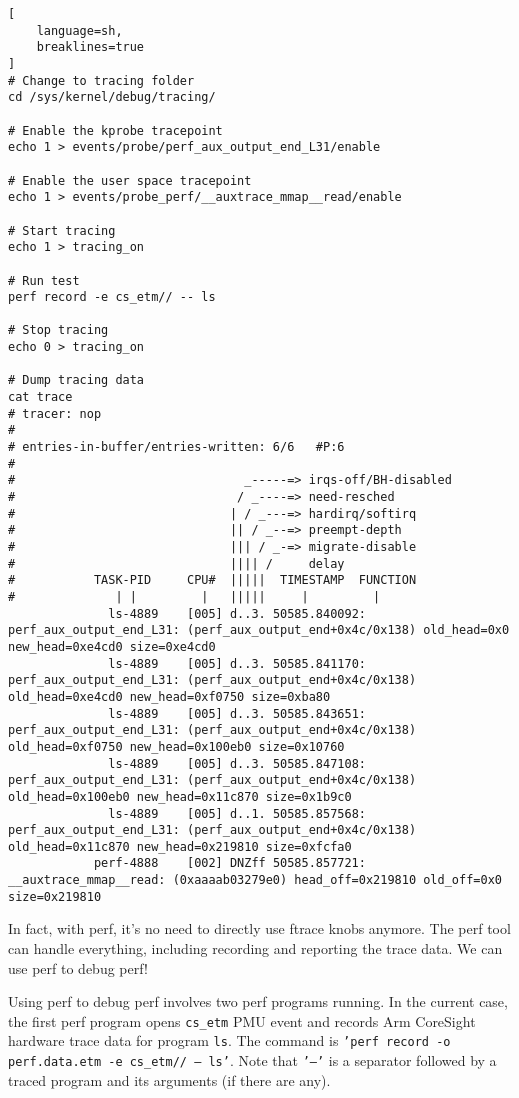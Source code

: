 \documentclass[11pt]{diazessay} %
\def\code#1{\texttt{#1}}
\begin{document}
\begin{lstlisting}[
  	language=sh,
	breaklines=true
]
# Change to tracing folder
cd /sys/kernel/debug/tracing/

# Enable the kprobe tracepoint
echo 1 > events/probe/perf_aux_output_end_L31/enable

# Enable the user space tracepoint
echo 1 > events/probe_perf/__auxtrace_mmap__read/enable

# Start tracing
echo 1 > tracing_on

# Run test
perf record -e cs_etm// -- ls

# Stop tracing
echo 0 > tracing_on

# Dump tracing data
cat trace
# tracer: nop
#
# entries-in-buffer/entries-written: 6/6   #P:6
#
#                                _-----=> irqs-off/BH-disabled
#                               / _----=> need-resched
#                              | / _---=> hardirq/softirq
#                              || / _--=> preempt-depth
#                              ||| / _-=> migrate-disable
#                              |||| /     delay
#           TASK-PID     CPU#  |||||  TIMESTAMP  FUNCTION
#              | |         |   |||||     |         |
              ls-4889    [005] d..3. 50585.840092: perf_aux_output_end_L31: (perf_aux_output_end+0x4c/0x138) old_head=0x0 new_head=0xe4cd0 size=0xe4cd0
              ls-4889    [005] d..3. 50585.841170: perf_aux_output_end_L31: (perf_aux_output_end+0x4c/0x138) old_head=0xe4cd0 new_head=0xf0750 size=0xba80
              ls-4889    [005] d..3. 50585.843651: perf_aux_output_end_L31: (perf_aux_output_end+0x4c/0x138) old_head=0xf0750 new_head=0x100eb0 size=0x10760
              ls-4889    [005] d..3. 50585.847108: perf_aux_output_end_L31: (perf_aux_output_end+0x4c/0x138) old_head=0x100eb0 new_head=0x11c870 size=0x1b9c0
              ls-4889    [005] d..1. 50585.857568: perf_aux_output_end_L31: (perf_aux_output_end+0x4c/0x138) old_head=0x11c870 new_head=0x219810 size=0xfcfa0
            perf-4888    [002] DNZff 50585.857721: __auxtrace_mmap__read: (0xaaaab03279e0) head_off=0x219810 old_off=0x0 size=0x219810
\end{lstlisting}

In fact, with perf, it's no need to directly use ftrace knobs anymore. The
perf tool can handle everything, including recording and reporting the trace
data. We can use perf to debug perf!

Using perf to debug perf involves two perf programs running. In the current
case, the first perf program opens \code{cs\_etm} PMU event and records
Arm CoreSight hardware trace data for program \code{ls}. The command is
\code{'perf record -o perf.data.etm -e cs\_etm// --- ls'}. Note that
\code{'---'} is a separator followed by a traced program and its arguments (if
there are any).
\end{document}
